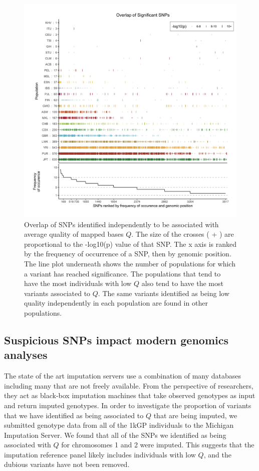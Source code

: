 \documentclass[9pt,lineno]{elife}
\begin{document}
\begin{figure}
\includegraphics[width=\hsize,keepaspectratio]{./Figures/SNPOverlap6.jpg}

\caption{Overlap of SNPs identified independently to be associated with average quality of mapped bases $Q$. 
The size of the crosses ( + ) are proportional to the -log10(p) value of that SNP.
The x axis is ranked by the frequency of occurrence of a SNP, then by genomic position.
The line plot underneath shows the number of populations for which a variant has reached significance.
The populations that tend to have the most individuals with low $Q$ also tend to have the most variants associated to $Q$. 
The same variants identified as being low quality independently in each population are found in other populations. }
  \label{OverLap}
\end{figure}

\subsection{Suspicious SNPs impact modern genomics analyses}
The state of the art imputation servers use a combination of many databases including many that are not freely available.
From the perspective of researchers, they act as black-box imputation machines that take observed genotypes as input and return imputed genotypes.  
In order to investigate the proportion of variants that we have identified as being associated to $Q$ that are being imputed, we submitted genotype data from all of the 1kGP individuals to the Michigan Imputation Server.
We found that all of the SNPs we identified as being associated with $Q$ for chromosomes 1 and 2 were imputed. 
This suggests that the imputation reference panel likely includes individuals with low $Q$, and the dubious variants have not been removed. 
\end{document}
